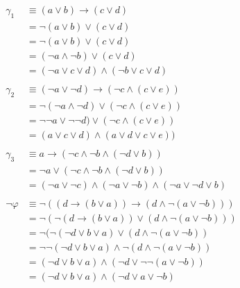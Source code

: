 \documentclass[a4paper]{article}
\theoremstyle{plain} \newtheorem{PrimerPrincipio}{Teorema}
\theoremstyle{plain} \newtheorem{SegundoPrincipio}{Teorema}
\begin{document}

\begin{align*}
		\gamma_1{}&\equiv(a\lor b)\rightarrow(c\lor d)\\
			&=\neg(a\lor b)\lor (c\lor d)\\&=\neg(a\lor b)\lor (c\lor d)\\
			&=(\neg a \land \neg b)\lor(c \lor d)\\
			&= (\neg a\lor c\lor d) \land (\neg b\lor c \lor d)\\
			\\
		\gamma_2{}&\equiv(\neg a\lor\neg d)\rightarrow(\neg c\land(c\lor e))\\
			&=\neg(\neg a\land\neg d)\lor(\neg c\land(c\lor e))\\
			&=\neg\neg a\lor\neg\neg d)\lor(\neg c\land(c\lor e))\\
			&=(a\lor c\lor d)\land(a\lor d\lor c\lor e))\\
			\\
		\gamma_3{}&\equiv a \rightarrow(\neg c\land\neg b\land(\neg d\lor b))\\
			&=\neg a\lor(\neg c\land\neg b\land(\neg d\lor b))\\
			&=(\neg a\lor\neg c)\land(\neg a\lor \neg b)\land(\neg a\lor\neg d\lor b)\\
			\\
		\neg\varphi{}&\equiv\neg((d\rightarrow(b\lor a))\rightarrow(d\land\neg(a\lor\neg b)))\\
			&=\neg(\neg(d\rightarrow(b\lor a))\lor(d\land\neg(a\lor\neg b)))\\
			&=\neg(\neg(\neg d\lor b\lor a)\lor(d\land\neg(a\lor\neg b))\\
			&=\neg\neg(\neg d\lor b\lor a)\land\neg(d\land\neg(a\lor\neg b))\\
			&=(\neg d\lor b\lor a)\land(\neg d\lor\neg\neg(a\lor\neg b))\\
			&=(\neg d\lor b\lor a)\land(\neg d\lor a\lor\neg b)\\
\end{align*}
\end{document}
